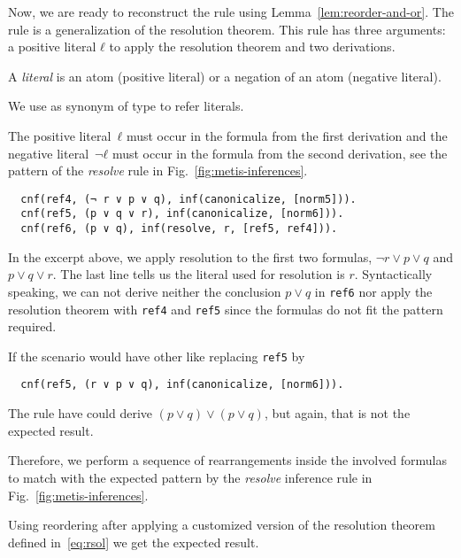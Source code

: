 \documentclass[../../main.tex]{subfiles}
\begin{document}
Now, we are ready to reconstruct the \resolve rule using
Lemma~\ref{lem:reorder-and-or}.
The \resolve rule is a generalization of the resolution theorem.
This rule has three arguments: a positive literal $ℓ$ to apply the
resolution theorem and two derivations.

\begin{mydefinition}
A \emph{literal} is an atom (positive literal) or a negation
of an atom (negative literal).
\end{mydefinition}

\begin{notation}
We use \Lit as synonym of \Prop type to refer literals.
\end{notation}

The positive literal~$ℓ$ must occur in the formula from the first
derivation and the negative literal~$¬ ℓ$ must occur in the formula
from the second derivation, see the pattern of the \emph{resolve} rule
in Fig.~\ref{fig:metis-inferences}.

\begin{myexamplenum}\hspace{10cm}
\label{ex:resolve-tstp}
\begin{verbatim}
  cnf(ref4, (¬ r ∨ p ∨ q), inf(canonicalize, [norm5])).
  cnf(ref5, (p ∨ q ∨ r), inf(canonicalize, [norm6])).
  cnf(ref6, (p ∨ q), inf(resolve, r, [ref5, ref4])).
\end{verbatim}
In the excerpt above, we apply resolution to the first two formulas,
$¬ r ∨ p ∨ q$ and $p ∨ q ∨ r$. The last line tells us the literal used
for resolution is $r$. Syntactically speaking,
we can not derive neither the conclusion $p ∨ q$ in \verb!ref6! nor apply the resolution theorem with \verb!ref4! and \verb!ref5! since the formulas do not fit the pattern required.

If the scenario would have other like replacing \verb!ref5! by
\begin{verbatim}
  cnf(ref5, (r ∨ p ∨ q), inf(canonicalize, [norm6])).
\end{verbatim}
The \resolve rule have could derive $(p ∨ q) ∨ (p ∨ q)$, but again, that is not the expected result.
\end{myexamplenum}

Therefore, we perform a sequence of rearrangements inside the
involved formulas to match with the expected pattern by the
\emph{resolve} inference rule in Fig.~\ref{fig:metis-inferences}.

Using reordering after
applying a customized version of the resolution theorem defined
in~\eqref{eq:rsol} we get the expected result.
\end{document}
